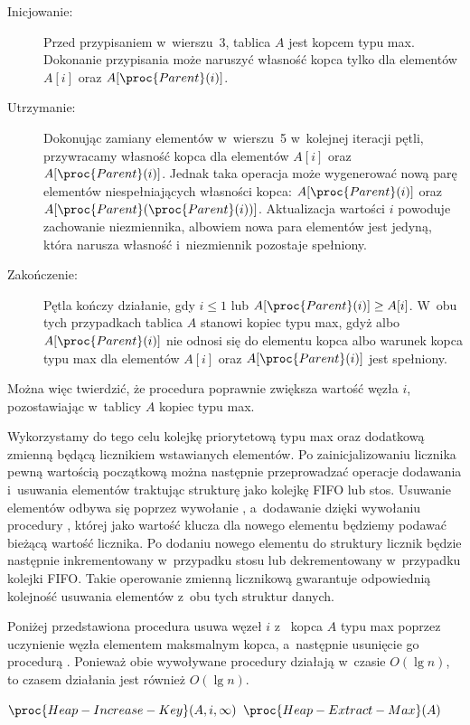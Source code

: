 \exercise %
\begin{description}
	\item[Inicjowanie:] Przed przypisaniem w~wierszu~3, tablica $A$ jest kopcem typu max. Dokonanie przypisania może naruszyć własność kopca tylko dla elementów $A[i]$ oraz $A[\proc{Parent}(i)]$.
	\item[Utrzymanie:] Dokonując zamiany elementów w~wierszu~5 w~kolejnej iteracji pętli, przywracamy własność kopca dla elementów $A[i]$ oraz $A[\proc{Parent}(i)]$. Jednak taka operacja może wygenerować nową parę elementów niespełniających własności kopca: $A[\proc{Parent}(i)]$ oraz $A[\proc{Parent}(\proc{Parent}(i))]$. Aktualizacja wartości $i$ powoduje zachowanie niezmiennika, albowiem nowa para elementów jest jedyną, która narusza własność i~niezmiennik pozostaje spełniony.
	\item[Zakończenie:] Pętla kończy działanie, gdy $i\le1$ lub $A[\proc{Parent}(i)]\ge A[i]$. W~obu tych przypadkach tablica $A$ stanowi kopiec typu max, gdyż albo $A[\proc{Parent}(i)]$ nie odnosi się do elementu kopca albo warunek kopca typu max dla elementów $A[i]$ oraz $A[\proc{Parent}(i)]$ jest spełniony.
\end{description}
Można więc twierdzić, że procedura  poprawnie zwiększa wartość węzła $i$, pozostawiając w~tablicy $A$ kopiec typu max.

\exercise %
Wykorzystamy do tego celu kolejkę priorytetową typu max oraz dodatkową zmienną będącą licznikiem wstawianych elementów. Po zainicjalizowaniu licznika pewną wartością początkową można następnie przeprowadzać operacje dodawania i~usuwania elementów traktując strukturę jako kolejkę FIFO lub stos. Usuwanie elementów odbywa się poprzez wywołanie , a~dodawanie dzięki wywołaniu procedury , której jako wartość klucza dla nowego elementu będziemy podawać bieżącą wartość licznika. Po dodaniu nowego elementu do struktury licznik będzie następnie inkrementowany w~przypadku stosu lub dekrementowany w~przypadku kolejki FIFO. Takie operowanie zmienną licznikową gwarantuje odpowiednią kolejność usuwania elementów z~obu tych struktur danych.

\exercise %
Poniżej przedstawiona procedura  usuwa węzeł $i$ z~ kopca $A$ typu max poprzez uczynienie węzła elementem maksmalnym kopca, a~następnie usunięcie go procedurą . Ponieważ obie wywoływane procedury działają w~czasie $O(\lg n)$, to czasem działania  jest również $O(\lg n)$.
\begin{codebox}
\li	$\proc{Heap-Increase-Key}(A,i,\infty)$
\li	$\proc{Heap-Extract-Max}(A)$
\end{codebox}


